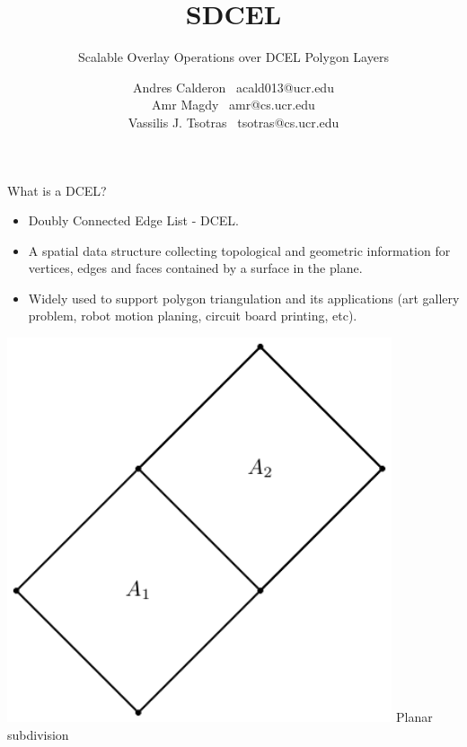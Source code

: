 \documentclass{beamer}
\title{SDCEL}
\subtitle{Scalable Overlay Operations over DCEL Polygon Layers}
\author{
    Andres Calderon \textperiodcentered \ acald013@ucr.edu \\
    Amr Magdy \textperiodcentered \ amr@cs.ucr.edu \\ 
    Vassilis J. Tsotras \textperiodcentered \ tsotras@cs.ucr.edu
}
\institute{University of California, Riverside}
\begin{document}
    \begin{frame}
        \maketitle
    \end{frame}

    \begin{frame}{What is a DCEL?}
        \begin{minipage}{0.65\textwidth}
        \begin{itemize}
            \item Doubly Connected Edge List - DCEL.
            \item A spatial data structure collecting topological and geometric information for vertices, edges and faces contained by a surface in the plane.
            \item Widely used to support polygon triangulation and its applications (art gallery problem, robot motion planing, circuit board printing, etc).
        \end{itemize}
        \end{minipage}\hfill %
        \begin{minipage}{0.34\textwidth}
            \centering
            \includegraphics[width=0.85\textwidth]{figures/planar_subdivision}
            \tiny{Planar subdivision} \\
            \vspace{0.25cm}

\end{minipage}
\end{frame}
\end{document}
